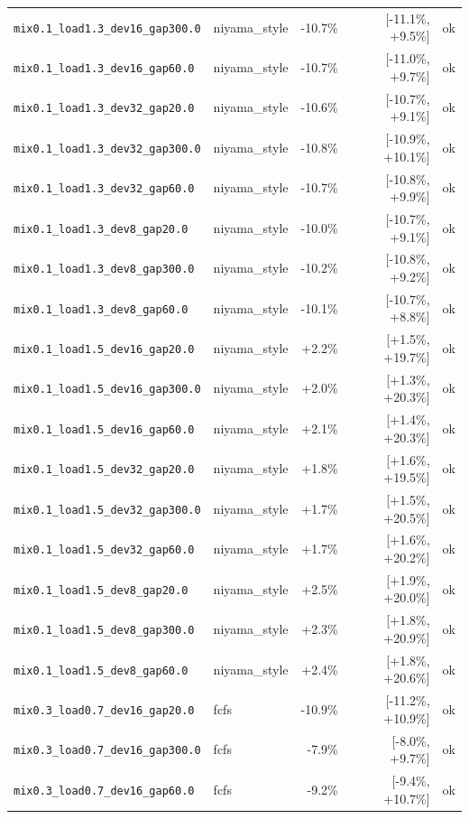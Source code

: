 \begin{longtable}{llrrl}
\texttt{mix0.1\_load1.3\_dev16\_gap300.0} & niyama\_style & -10.7\% & [-11.1\%, +9.5\%] & ok \\
\texttt{mix0.1\_load1.3\_dev16\_gap60.0} & niyama\_style & -10.7\% & [-11.0\%, +9.7\%] & ok \\
\texttt{mix0.1\_load1.3\_dev32\_gap20.0} & niyama\_style & -10.6\% & [-10.7\%, +9.1\%] & ok \\
\texttt{mix0.1\_load1.3\_dev32\_gap300.0} & niyama\_style & -10.8\% & [-10.9\%, +10.1\%] & ok \\
\texttt{mix0.1\_load1.3\_dev32\_gap60.0} & niyama\_style & -10.7\% & [-10.8\%, +9.9\%] & ok \\
\texttt{mix0.1\_load1.3\_dev8\_gap20.0} & niyama\_style & -10.0\% & [-10.7\%, +9.1\%] & ok \\
\texttt{mix0.1\_load1.3\_dev8\_gap300.0} & niyama\_style & -10.2\% & [-10.8\%, +9.2\%] & ok \\
\texttt{mix0.1\_load1.3\_dev8\_gap60.0} & niyama\_style & -10.1\% & [-10.7\%, +8.8\%] & ok \\
\texttt{mix0.1\_load1.5\_dev16\_gap20.0} & niyama\_style & +2.2\% & [+1.5\%, +19.7\%] & ok \\
\texttt{mix0.1\_load1.5\_dev16\_gap300.0} & niyama\_style & +2.0\% & [+1.3\%, +20.3\%] & ok \\
\texttt{mix0.1\_load1.5\_dev16\_gap60.0} & niyama\_style & +2.1\% & [+1.4\%, +20.3\%] & ok \\
\texttt{mix0.1\_load1.5\_dev32\_gap20.0} & niyama\_style & +1.8\% & [+1.6\%, +19.5\%] & ok \\
\texttt{mix0.1\_load1.5\_dev32\_gap300.0} & niyama\_style & +1.7\% & [+1.5\%, +20.5\%] & ok \\
\texttt{mix0.1\_load1.5\_dev32\_gap60.0} & niyama\_style & +1.7\% & [+1.6\%, +20.2\%] & ok \\
\texttt{mix0.1\_load1.5\_dev8\_gap20.0} & niyama\_style & +2.5\% & [+1.9\%, +20.0\%] & ok \\
\texttt{mix0.1\_load1.5\_dev8\_gap300.0} & niyama\_style & +2.3\% & [+1.8\%, +20.9\%] & ok \\
\texttt{mix0.1\_load1.5\_dev8\_gap60.0} & niyama\_style & +2.4\% & [+1.8\%, +20.6\%] & ok \\
\texttt{mix0.3\_load0.7\_dev16\_gap20.0} & fcfs & -10.9\% & [-11.2\%, +10.9\%] & ok \\
\texttt{mix0.3\_load0.7\_dev16\_gap300.0} & fcfs & -7.9\% & [-8.0\%, +9.7\%] & ok \\
\texttt{mix0.3\_load0.7\_dev16\_gap60.0} & fcfs & -9.2\% & [-9.4\%, +10.7\%] & ok \\

\end{longtable}
